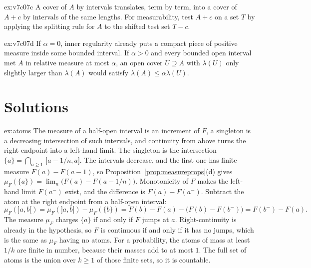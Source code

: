 \begin{hint}{ex:v7c07c}
A cover of $A$ by intervals translates, term by term, into a cover of $A+c$ by intervals of the same lengths.
For measurability, test $A+c$ on a set $T$ by applying the splitting rule for $A$ to the shifted test set $T-c$.
\end{hint}

\begin{hint}{ex:v7c07d}
If $\alpha=0$, inner regularity already puts a compact piece of positive measure inside some bounded interval.
If $\alpha>0$ and every bounded open interval met $A$ in relative measure at most $\alpha$, an open cover $U\supseteq A$ with $\lambda(U)$ only slightly larger than $\lambda(A)$ would satisfy $\lambda(A)\le\alpha\lambda(U)$.
\end{hint}

\section{Solutions}

\begin{solution}{ex:atoms}
\idea The measure of a half-open interval is an increment of $F$, a singleton is a decreasing intersection of such intervals, and continuity from above turns the right endpoint into a left-hand limit.
\writeup The singleton is the intersection $\{a\}=\bigcap_{n\ge1}\,]a-1/n,a]$.
The intervals decrease, and the first one has finite measure $F(a)-F(a-1)$, so Proposition~\ref{prop:measureprops}(d) gives $\mu_F(\{a\})=\lim_n\bigl(F(a)-F(a-1/n)\bigr)$.
Monotonicity of $F$ makes the left-hand limit $F(a^-)$ exist, and the difference is $F(a)-F(a^-)$.
Subtract the atom at the right endpoint from a half-open interval:
\[
\mu_F(]a,b[)=\mu_F(]a,b])-\mu_F(\{b\})=F(b)-F(a)-\bigl(F(b)-F(b^-)\bigr)=F(b^-)-F(a).
\]
The measure $\mu_F$ charges $\{a\}$ if and only if $F$ jumps at $a$.
Right-continuity is already in the hypothesis, so $F$ is continuous if and only if it has no jumps, which is the same as $\mu_F$ having no atoms.
For a probability, the atoms of mass at least $1/k$ are finite in number, because their masses add to at most $1$.
The full set of atoms is the union over $k\ge1$ of those finite sets, so it is countable.
\end{solution}

